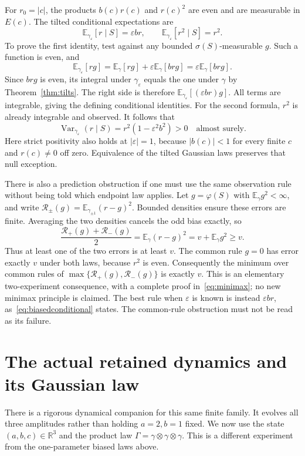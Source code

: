 \documentclass[11pt]{article}
\newcommand{\R}{\mathbb R}\newcommand{\Z}{\mathbb Z}
\newcommand{\E}{\mathbb E}\newcommand{\Var}{\operatorname{Var}}
\begin{document}
For $r_0=|c|$, the products $b(c)r(c)$ and $r(c)^2$ are even and
are measurable in $E(c)$. The tilted conditional expectations are
\begin{equation}\label{eq:biasedconditional}
 \E_{\gamma_\varepsilon}[r\mid S]=\varepsilon br,
 \qquad
 \E_{\gamma_\varepsilon}[r^2\mid S]=r^2.
\end{equation}
To prove the first identity, test against any bounded
$\sigma(S)$-measurable $g$. Such a function is even, and
\[
 \E_{\gamma_\varepsilon}[rg]
   =\E_\gamma[rg]+\varepsilon\E_\gamma[brg]
   =\varepsilon\E_\gamma[brg].
\]
Since $brg$ is even, its integral under $\gamma_\varepsilon$ equals
the one under $\gamma$ by Theorem~\ref{thm:tilts}. The right side
is therefore $\E_{\gamma_\varepsilon}[(\varepsilon br)g]$.
All terms are integrable, giving the defining conditional identities.
For the second formula, $r^2$ is already integrable and observed.
It follows that
\begin{equation}\label{eq:biasedvariance}
 \Var_{\gamma_\varepsilon}(r\mid S)
       =r^2(1-\varepsilon^2b^2)>0\quad\text{almost surely}.
\end{equation}
Here strict positivity also holds at $|\varepsilon|=1$, because
$|b(c)|<1$ for every finite $c$ and $r(c)\ne0$ off zero.
Equivalence of the tilted Gaussian laws preserves that null exception.

There is also a prediction obstruction if one must use the same
observation rule without being told which endpoint law applies.
Let $g=\varphi(S)$ with $\E_\gamma g^2<\infty$, and write
$\mathcal R_\pm(g)=\E_{\gamma_{\pm1}}(r-g)^2$.
Bounded densities ensure these errors are finite. Averaging the two
densities cancels the odd bias exactly, so
\begin{equation}\label{eq:minimax}
 \frac{\mathcal R_+(g)+\mathcal R_-(g)}2
       =\E_\gamma(r-g)^2=v+\E_\gamma g^2\geq v.
\end{equation}
Thus at least one of the two errors is at least $v$. The common rule
$g=0$ has error exactly $v$ under both laws, because $r^2$ is even.
Consequently the minimum over common rules of
$\max\{\mathcal R_+(g),\mathcal R_-(g)\}$ is exactly $v$.
This is an elementary two-experiment consequence, with a complete
proof in~\eqref{eq:minimax}; no new minimax principle is claimed.
The best rule when $\varepsilon$ is known is instead
$\varepsilon br$, as~\eqref{eq:biasedconditional} states. The
common-rule obstruction must not be read as its failure.


\section{The actual retained dynamics and its Gaussian law}\label{sec:retainedflow}
There is a rigorous dynamical companion for this same finite family.
It evolves all three amplitudes rather than holding $a=2,b=1$ fixed.
We now use the state $(a,b,c)\in\R^3$ and the product law
$\Gamma=\gamma\otimes\gamma\otimes\gamma$. This is a different
experiment from the one-parameter biased laws above.
\end{document}

